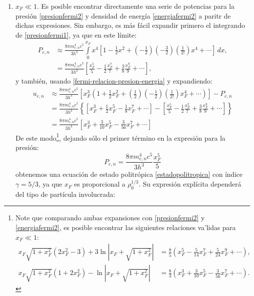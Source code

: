 \begin{enumerate}
 \item $x_F\ll1$. Es posible encontrar directamente una serie de potencias para la presión \eqref{presionfermi2} y densidad de energía \eqref{energiafermi2} a paritr de dichas expresiones. Sin embargo, es más fácil expandir primero el integrando de \eqref{presionfermi1}, ya que en este límite:
\begin{align}
P_{e,n}&\approx\frac{8\pi m_{e,n}^4c^5}{3h^3}\int\limits_0^{x_F}x^4\left[1-\frac{1}{2}x^2+\left(-\frac{1}{2}\right)\left(-\frac{3}{2}\right)\left(\frac{1}{2!}\right)x^4+\cdots\right]\,dx,\\
&=\frac{8\pi m_{e,n}^4c^5}{3h^3}\left[\frac{x_F^5}{5}-\frac{1}{2}\frac{x_F^7}{7}+\frac{3}{8}\frac{x_F^9}{9}+\cdots\right],
\end{align}
y también, usando \eqref{fermi-relacion-presion-energia} y expandiendo:
\begin{align}
 u_{e,n}&\approx\frac{8\pi m_{e,n}^4c^5}{3h^3}\left[x_F^3\left(1+\frac{1}{2}x_F^2+\left(\frac{1}{2}\right)\left(-\frac{1}{2}\right)\left(\frac{1}{2!}\right)x_F^4+\cdots\right)\right]-P_{e,n}\\
&=\frac{8\pi m_{e,n}^4c^5}{3h^3}\left\{\left[x_F^3+\frac{1}{2}x_F^5-\frac{1}{8}x_F^7+\cdots\right]-\left[\frac{x_F^5}{5}-\frac{1}{2}\frac{x_F^7}{7}+\frac{3}{8}\frac{x_F^9}{9}+\cdots\right]\right\}\\
&=\frac{8\pi m_{e,n}^4c^5}{3h^3}\left[x_F^3+\frac{3}{10}x_F^5-\frac{3}{56}x_F^7+\cdots \right]
\end{align}
De este modo\footnote{Note que comparando ambas expansiones con \eqref{presionfermi2} y \eqref{energiafermi2}, es posible encontrar las siguientes relaciones va'lidas para $x_F\ll1$:
\begin{align}
 x_F\sqrt{1+x_F^2}\left(2x_F^2-3\right)+3\ln\left|x_F+\sqrt{1+x_F^2}\right|&=\frac{8}{5}\left(x_F^5-\frac{5}{14}x_F^7+\frac{5}{24}x_F^9+\cdots\right),\\
 x_F\sqrt{1+x_F^2}\left(1+2x_F^2\right)-\ln\left|x_F+\sqrt{1+x_F^2}\right|&=\frac{8}{3}\left(x_F^3+\frac{3}{10}x_F^5-\frac{3}{56}x_F^7+\cdots \right).
\end{align}
}, dejando sólo el primer término en la expresión para la presión:
\begin{equation}\label{presionfermi1-asintotico}
P_{e,n}=\frac{8\pi m_{e,n}^4c^5}{3h^3}\frac{x_F^5}{5}
\end{equation}
obtenemos una ecuación de estado politrópica \eqref{estadopolitropica} con índice $\gamma=5/3$, ya que $x_F$ es proporcional a $\rho_0^{1/3}$. Su expresión explícita dependerá del tipo de partícula involucrada:

\end{enumerate}
